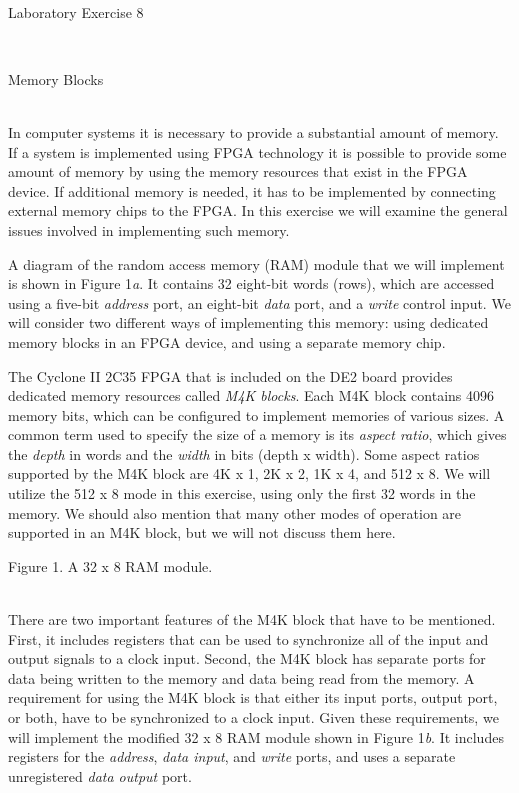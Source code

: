 \documentclass[psfig,10pt,fullpage]{article}
\begin{document}
~\\
\centerline{\huge Laboratory Exercise 8}
~\\
\centerline{\large Memory Blocks}
~\\

In computer systems it is necessary to provide a substantial amount of memory.
If a system is implemented using FPGA technology it is possible
to provide some amount of memory by using the memory resources that exist
in the FPGA device. If additional memory is needed, it has to be implemented
by connecting external memory chips to the FPGA. 
In this exercise we will examine the general issues involved in implementing 
such memory.

A diagram of the random access memory (RAM) module that we will implement is shown in Figure
1{\it a}. It contains 32 eight-bit words (rows), which are accessed using a five-bit
{\it address} port, an eight-bit {\it data} port, and a {\it write} control input. We will
consider two different ways of implementing this memory: using dedicated memory
blocks in an FPGA device, and using a separate memory chip. 

The Cyclone II 2C35 FPGA that
is included on the DE2 board provides dedicated memory resources called {\it M4K
blocks}. Each M4K block contains 4096 memory bits, which can be configured to implement 
memories of various sizes. A common term used to specify the size of a
memory is its {\it aspect ratio}, which gives the {\it depth} in words and the
{\it width} in bits (depth {\sf x} width).
Some aspect ratios supported by the M4K block are 4K {\sf x} 1, 2K {\sf x} 2,
1K {\sf x} 4, and 512 {\sf x} 8. We will utilize the 512 {\sf x} 8 mode in this exercise,
using only the first 32 words in the memory. We should also mention
that many other modes of operation are supported in an M4K block, but we
will not discuss them here.

\begin{figure}[H]
\scriptsize
\centerline{
\hbox{}}
\end{figure}
\centerline{Figure 1.  A 32 {\sf x} 8 RAM module.}
~\\
There are two important features of the M4K block that have to be mentioned.
First, it includes registers that can be used to synchronize all of the 
input and output signals to a clock input. Second, the M4K block has separate
ports for data being written to the memory and data being read from the memory. A
requirement for using the M4K block is that either its input ports, output port, or
both, have to be synchronized to a clock input. Given these requirements,
we will implement the modified 32 {\sf x} 8 RAM module shown in Figure 1{\it b}. It includes 
registers for the {\it address}, {\it data input}, and {\it write} ports, and uses a separate
unregistered {\it data output} port.
\end{document}
